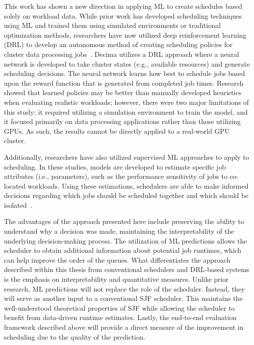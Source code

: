 This work has shown a new direction in applying ML to create schedules based solely on workload data. While prior work has developed scheduling techniques using ML and trained them using simulated environments or traditional optimization methods, researchers have now utilized deep reinforcement learning (DRL) to develop an autonomous method of creating scheduling policies for cluster data processing jobs~\cite{mao2019learning}. Decima utilizes a DRL approach where a neural network is developed to take cluster states (e.g., available resources) and generate scheduling decisions. The neural network learns how best to schedule jobs based upon the reward function that is generated from completed job times. Research showed that learned policies may be better than manually developed heuristics when evaluating realistic workloads; however, there were two major limitations of this study: it required utilizing a simulation environment to train the model, and it focused primarily on data processing applications rather than those utilizing GPUs. As such, the results cannot be directly applied to a real-world GPU cluster.

Additionally, researchers have also utilized supervised ML approaches to apply to scheduling. In these studies, models are developed to estimate specific job attributes (i.e., parameters), such as the performance sensitivity of jobs to co-located workloads. Using these estimations, schedulers are able to make informed decisions regarding which jobs should be scheduled together and which should be isolated~\cite{delimitrou2013paragon,delimitrou2014quasar}.

\clearpage
The advantages of the approach presented here include preserving the ability to understand why a decision was made, maintaining the interpretability of the underlying decision-making process. The utilization of ML predictions allows the scheduler to obtain additional information about potential job runtimes, which can help improve the order of the queues. What differentiates the approach described within this thesis from conventional schedulers and DRL-based systems is the emphasis on interpretability and quantitative measures. Unlike prior research, ML predictions will not replace the role of the scheduler. Instead, they will serve as another input to a conventional SJF scheduler. This maintains the well-understood theoretical properties of SJF while allowing the scheduler to benefit from data-driven runtime estimates. Lastly, the end-to-end evaluation framework described above will provide a direct measure of the improvement in scheduling due to the quality of the prediction.

